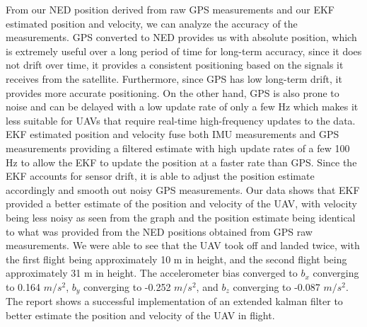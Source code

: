 From our NED position derived from raw GPS measurements and our EKF estimated position and velocity, we can analyze the accuracy of the measurements. GPS converted to NED provides us with absolute position, which is extremely useful over a long period of time for long-term accuracy, since it does not drift over time, it provides a consistent positioning based on the signals it receives from the satellite. Furthermore, since GPS has low long-term drift, it provides more accurate positioning. On the other hand, GPS is also prone to noise and can be delayed with a low update rate of only a few Hz which makes it less suitable for UAVs that require real-time high-frequency updates to the data. EKF estimated position and velocity fuse both IMU measurements and GPS measurements providing a filtered estimate with high update rates of a few 100 Hz to allow the EKF to update the position at a faster rate than GPS. Since the EKF accounts for sensor drift, it is able to adjust the position estimate accordingly and smooth out noisy GPS measurements. Our data shows that EKF provided a better estimate of the position and velocity of the UAV, with velocity being less noisy as seen from the graph and the position estimate being identical to what was provided from the NED positions obtained from GPS raw measurements. We were able to see that the UAV took off and landed twice, with the first flight being approximately 10 m in height, and the second flight being approximately 31 m in height. The accelerometer bias converged to $b_x$ converging to
0.164 $m/s^2$, $b_y$ converging to -0.252 $m/s^2$, and $b_z$ converging to -0.087 $m/s^2$. The report shows a successful implementation of an extended kalman filter to better estimate the position and velocity of the UAV in flight.